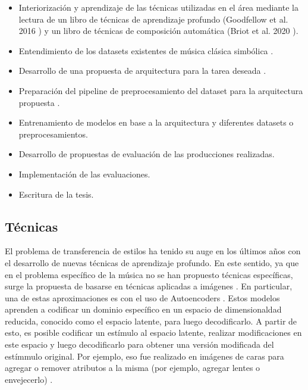 \documentclass[10pt]{article}
\begin{document}
\begin{itemize}
\item Interiorización y aprendizaje de las técnicas utilizadas en el área
  mediante la lectura de un libro de técnicas de aprendizaje profundo
  (Goodfellow et al. 2016 \cite{goodfellow2016deep}) y un libro de técnicas de
  composición automática (Briot et al. 2020 \cite{briot2020deep}).
\item Entendimiento de los datasets existentes de música clásica simbólica  \cite{Cuthbert2010Music21AT}.
\item Desarrollo de una propuesta de arquitectura para la tarea deseada \cite{guo2020variational, roberts2019musicvae}.
\item Preparación del pipeline de preprocesamiento del dataset para la arquitectura propuesta \cite{Cuthbert2010Music21AT}.
\item Entrenamiento de modelos en base a la arquitectura y diferentes datasets o preprocesamientos.
\item Desarrollo de propuestas de evaluación de las producciones realizadas.
\item Implementación de las evaluaciones.
\item Escritura de la tesis.
\end{itemize}

\subsection*{Técnicas}
El problema de transferencia de estilos ha tenido su auge en los últimos años
con el desarrollo de nuevas técnicas de aprendizaje profundo. En este
sentido, ya que en el problema específico de la música no se han propuesto
técnicas específicas, surge la propuesta de basarse en técnicas aplicadas a
imágenes \cite{briot2020deep}. En particular, una de estas aproximaciones es
con el uso de Autoencoders \cite{goodfellow2016deep}. Estos modelos aprenden a
codificar un dominio específico en un espacio de dimensionaldad reducida,
conocido como el espacio latente, para luego decodificarlo. A partir de esto,
es posible codificar un estímulo al espacio latente, realizar modificaciones
en este espacio y luego decodificarlo para obtener una versión modificada del
estímmulo original. Por ejemplo, eso fue realizado en imágenes de caras para
agregar o remover atributos a la misma (por ejemplo, agregar lentes o
envejecerlo)  \cite{upchurch2016feature}.
\end{document}

